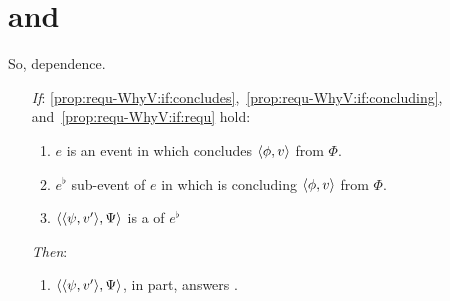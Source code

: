 \section{ and \qWhyV{}}

\begin{note}
  \questionWhyV*

  So, dependence.

  \begin{proposition}
    \label{prop:requ-WhyV}

    \begin{itemize}
    \item[\emph{If}:]
      \ref{prop:requ-WhyV:if:concludes},~\ref{prop:requ-WhyV:if:concluding}, and~\ref{prop:requ-WhyV:if:requ} hold:
      \begin{enumerate}[label=\alph*., ref=(\alph*), series=propRequWhyVSeries]
      \item
        \label{prop:requ-WhyV:if:concludes}
        \(e\) is an event in which \vAgent{} concludes \(\langle \phi, v \rangle\) from \(\Phi\).
      \item
        \label{prop:requ-WhyV:if:concluding}
        \(e^{\flat}\) sub-event of \(e\) in which \vAgent{} is concluding \(\langle \phi, v \rangle\) from \(\Phi\).
      \item
        \label{prop:requ-WhyV:if:requ}
        \(\langle \langle \psi, v' \rangle, \Psi \rangle\) is a \requ{} of \(e^{\flat}\)
      \end{enumerate}
    \item[\emph{Then}:]
      \begin{enumerate}[label=\alph*., ref=(\alph*), resume*=propRequWhyVSeries]
      \item
        \label{prop:requ-WhyV:tn:answer}
        \(\langle \langle \psi, v' \rangle, \Psi \rangle\), in part, answers \qWhyV{}.
      \end{enumerate}
    \end{itemize}
    \vspace{-\baselineskip}
  \end{proposition}


\end{note}

